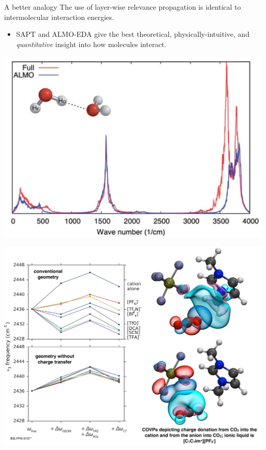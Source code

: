 \documentclass[xetex,compress]{beamer}
\begin{document}

\begin{frame}{A better analogy}
  The use of layer-wise relevance propagation is identical to intermolecular interaction energies.
  \begin{itemize}
  \item SAPT and ALMO-EDA give the best theoretical, physically-intuitive, and \emph{quantitative} insight into how molecules interact.
  \end{itemize}
\end{frame}

\begin{frame}{}
  \begin{center}
    \includegraphics[scale=0.50]{./figures/almo_water_combined.pdf}
  \end{center}
\end{frame}

\begin{frame}{}
  \begin{center}
    \includegraphics[scale=0.30]{./figures/slide_ionic_liquid.pdf}
  \end{center}
\end{frame}
\end{document}

